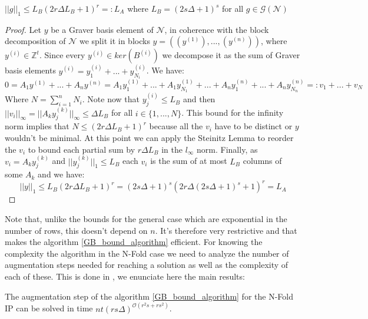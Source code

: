 \begin{lemma}
    $||g||_1 \leq L_B (2r\Delta L_B + 1)^r =: L_A$ where $L_B = (2s \Delta + 1)^s$ for all $g \in \mathcal{G}(\mathcal{N})$
\end{lemma}
\vspace{-20pt}
\begin{proof}
Let $y$ be a Graver basis element of $\mathcal{N}$, in coherence with the block decomposition of $\mathcal{N}$ we split it in blocks $y = ((y^{(1)}), ... , (y^{(n)}))$, where $y^{(i)} \in \mathbb{Z}^t$. Since every $y^{(i)} \in ker(B^{(i)})$ we decompose it as the sum of Graver basis elements $y^{(i)} = y^{(i)}_1 +  ... + y^{(i)}_{N_i}$. We have: %
\begin{equation*}
    0 = A_1y^{(1)} + ... + A_ny^{(n)} = A_1y^{(1)}_1 + ... + A_1y^{(1)}_{N_1} + ... + A_ny^{(n)}_1 + ... + A_ny^{(n)}_{N_n} =: v_1 + ... + v_N %
\end{equation*}
Where $N = \sum_{i=1}^n N_i$. Note now that $y^{(i)}_j \leq L_B$  and then $||v_i||_\infty = ||A_ky^{(k)}_j||_\infty \leq \Delta L_B$ for all $i \in \{1, ..., N\}$. This bound for the infinity norm implies that $N \leq (2r\Delta L_B + 1)^r$ because all the $v_i$ have to be distinct or $y$ wouldn't be minimal.  At this point we can apply the Steinitz Lemma to reorder the $v_i$ to bound each partial sum by $r\Delta L_B$ in the $l_\infty$ norm. Finally, as $ v_i = A_ky^{(k)}_j$ and $||y^{(k)}_j||_1 \leq L_B$ each $v_i$ is the sum of at most $L_B$ columns of some $A_k$ and we have:\\
\begin{equation*}
    ||y||_1 \leq L_B(2r\Delta L_B + 1)^r = (2s\Delta + 1)^s(2r\Delta (2s\Delta + 1)^s + 1)^r = L_A
\end{equation*}

\end{proof}

Note that, unlike the bounds for the general case which are exponential in the number of rows, this doesn't depend on $n$. It's therefore very restrictive and that makes the algorithm \ref{GB_bound_algorithm} efficient. For knowing the complexity the algorithm in the N-Fold case we need to analyze the number of augmentation steps needed for reaching a solution as well as the complexity of each of these. This is done in \cite[Lemmas 4,  5 and 6]{EISENBRAND:2018}, we enunciate here the main results: 

\begin{lemma} \label{NFold_augmentation_step_complexity}
The augmentation step of the algorithm \ref{GB_bound_algorithm} for the N-Fold IP can be solved in time $nt(rs\Delta)^{\mathcal{O}(r^2s+rs^2)}$.
\end{lemma}

